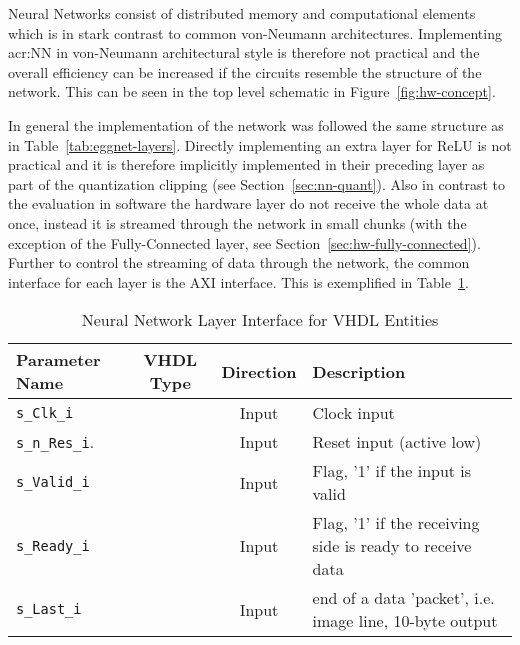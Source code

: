 
Neural Networks consist of distributed memory and computational elements which is in stark contrast to common von-Neumann architectures. Implementing \gls{acr:NN} in von-Neumann architectural style is therefore not practical and the overall efficiency can be increased if the circuits resemble the structure of the network. This can be seen in the top level schematic in Figure~\ref{fig:hw-concept}.

In general the implementation of the network was followed the same structure as in Table~\ref{tab:eggnet-layers}. Directly implementing an extra layer for ReLU is not practical and it is therefore implicitly implemented in their preceding layer as part of the quantization clipping (see Section~\ref{sec:nn-quant}). Also in contrast to the evaluation in software the hardware layer do not receive the whole data at once, instead it is streamed through the network in small chunks (with the exception of the Fully-Connected layer, see Section~\ref{sec:hw-fully-connected}). Further to control the streaming of data through the network, the common interface for each layer is the AXI interface. This is exemplified in Table~\ref{tab:hw-layer-interface}.

\begin{table}[h!]
\centering	
\begin{tabular}{l|ccl}
	\toprule
	Parameter Name 		   	   & VHDL Type  & Direction & Description 								\\
	\midrule
	\texttt{s\_Clk\_i} 	       & \stdlogic  & Input 	    & Clock input								\\
	\texttt{s\_n\_Res\_i}.     & \stdlogic  & Input 	    & Reset input (active low)					\\
	\texttt{s\_Valid\_i} 	   & \stdlogic  & Input 	    & Flag, '1' if the input is valid				\\
	\texttt{s\_Ready\_i} 	   & \stdlogic  & Input 	    & Flag, '1' if the receiving side is ready to receive data								\\
	\texttt{s\_Last\_i} 	   & \stdlogic  & Input 	    & end of a data 'packet', i.e. image line, 10-byte output		\\
	\bottomrule
\end{tabular}
\caption{Neural Network Layer Interface for VHDL Entities}
\label{tab:hw-layer-interface}
\end{table}

